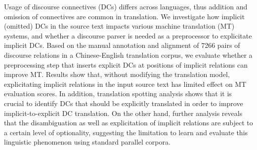 Usage of discourse connectives (DCs) differs across languages, thus addition and omission of connectives are common in translation. We investigate how implicit (omitted) DCs in the source text impacts various machine translation (MT) systems, and whether a discourse parser is needed as a preprocessor to explicitate implicit DCs. Based on the manual annotation and alignment of 7266 pairs of discourse relations in a Chinese-English translation corpus, we evaluate whether a preprocessing step that inserts explicit DCs at positions of implicit relations can improve MT. Results show that, without modifying the translation model, explicitating implicit relations in the input source text has limited effect on MT evaluation scores. In addition, translation spotting analysis shows that it is crucial to identify DCs that should be explicitly translated in order to improve implicit-to-explicit DC translation. On the other hand, further analysis reveals that the disambiguation as well as explicitation of implicit relations are subject to a certain level of optionality, suggesting the limitation to learn and evaluate this linguistic phenomenon using standard parallel corpora.
